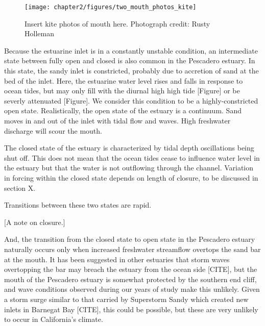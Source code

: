 \begin{figure}
\texttt{[image: chapter2/figures/two\_mouth\_photos\_kite]} 
\caption{Insert kite photos of mouth here. Photograph credit: Rusty Holleman}\label{fig:kite_photos} \end{figure}

Because the estuarine inlet is in a constantly unstable condition, an
intermediate state between fully open and closed is also common in the
Pescadero estuary.  In this state, the sandy inlet is constricted,
probably due to accretion of sand at the bed of the inlet. Here, the
estuarine water level rises and falls in response to ocean tides, but
may only fill with the diurnal high high tide [Figure] or be severly
attenuated [Figure]. We consider this condition to be a
highly-constricted open state. Realistically, the open state of the
estuary is a continuum. Sand moves in and out of the inlet with tidal
flow and waves. High freshwater discharge will scour the mouth.

The closed state of the estuary is characterized by tidal depth
oscillations being shut off. This does not mean that the ocean tides
cease to influence water level in the estuary but that the water is not
outflowing through the channel. Variation in forcing within the closed
state depends on length of closure, to be discussed in section {X}.

Transitions between these two states are rapid.

[A note on closure.]

And, the transition from the closed state to open state in the Pescadero
estuary naturally occurs only when increased freshwater streamflow
overtops the sand bar at the mouth. It has been suggested in other
estuaries that storm waves overtopping the bar may breach the estuary
from the ocean side [CITE], but the mouth of the Pescadero estuary is
somewhat protected by the southern end cliff, and wave conditions
observed during our years of study make this unlikely. Given a storm
surge similar to that carried by Superstorm Sandy which created new
inlets in Barnegat Bay [CITE], this could be possible, but these are
very unlikely to occur in California's climate.

